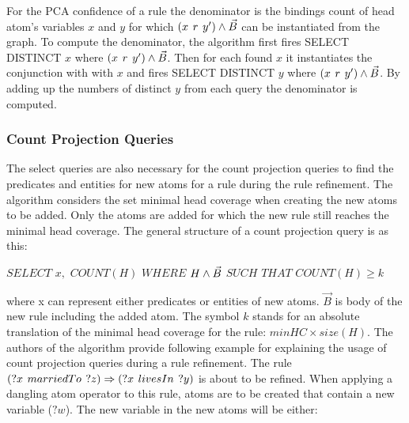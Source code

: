 For the PCA confidence of a rule the denominator is the bindings count of head atom's variables $x$ and $y$ for which $(x\hspace{0.4em}r\hspace{0.4em}y') \land \vec{B}$ can be instantiated from the graph. To compute the denominator, the algorithm first fires SELECT DISTINCT $x$ where $(x\hspace{0.4em}r\hspace{0.4em}y') \land \vec{B}$. Then for each found $x$ it instantiates the conjunction with with $x$ and fires SELECT DISTINCT $y$ where $(x\hspace{0.4em}r\hspace{0.4em}y') \land \vec{B}$. By adding up the numbers of distinct $y$ from each query the denominator is computed.

\subsubsection{Count Projection Queries}

The select queries are also necessary for the count projection queries to find the predicates and entities for new atoms for a rule during the rule refinement. The algorithm considers the set minimal head coverage when creating the new atoms to be added. Only the atoms are added for which the new rule still reaches the minimal head coverage. The general structure of a count projection query is as this:

$SELECT$ $x,$ $COUNT(H)$ $WHERE$ $H \land \vec{B}\\$
$SUCH$ $THAT$ $COUNT(H)\geq k$

where x can represent either predicates or entities of new atoms. $\vec{B}$ is body of the new rule including the added atom. The symbol $k$ stands for an absolute translation of the minimal head coverage for the rule: $minHC \times size(H)$. The authors of the algorithm provide following example for explaining the usage of count projection queries during a rule refinement. The rule $(?x\hspace{0.4em}marriedTo\hspace{0.4em}?z) \Rightarrow (?x\hspace{0.4em}livesIn\hspace{0.4em}?y)$ is about to be refined. When applying a dangling atom operator to this rule, atoms are to be created that contain a new variable ($?w$). The new variable in the new atoms will be either:

